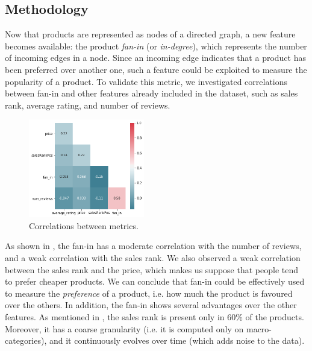 \documentclass[11pt]{article}
\begin{document}
\subsection{Methodology}
Now that products are represented as nodes of a directed graph, a new feature becomes available: the product \emph{fan-in} (or \emph{in-degree}), which represents the number of incoming edges in a node. Since an incoming edge indicates that a product has been preferred over another one, such a feature could be exploited to measure the popularity of a product. To validate this metric, we investigated correlations between fan-in and other features already included in the dataset, such as sales rank, average rating, and number of reviews.
\begin{figure}
	\centering{}
	\includegraphics[width=0.45\textwidth]{img/faninCorr.png}
	\caption{Correlations between metrics.}
	\label{fig:faninCorr}
\end{figure}
As shown in , the fan-in has a moderate correlation with the number of reviews, and a weak correlation with the sales rank. We also observed a weak correlation between the sales rank and the price, which makes us suppose that people tend to prefer cheaper products. We can conclude that fan-in could be effectively used to measure the \textit{preference} of a product, i.e. how much the product is favoured over the others. In addition, the fan-in shows several advantages over the other features. As mentioned in , the sales rank is present only in 60\% of the products. Moreover, it has a coarse granularity (i.e. it is computed only on macro-categories), and it continuously evolves over time (which adds noise to the data).
\end{document}

